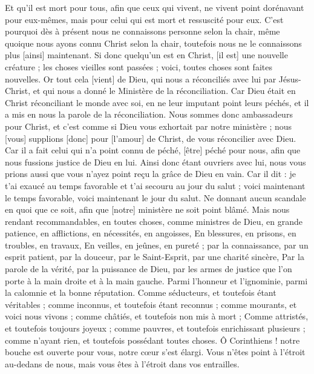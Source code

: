 \begin{multicols}{2}
Et qu'il est mort pour tous, afin que ceux qui vivent, ne vivent point dorénavant pour eux-mêmes, mais pour celui qui est mort et ressuscité pour eux.
C'est pourquoi dès à présent nous ne connaissons personne selon la chair, même quoique nous ayons connu Christ selon la chair, toutefois nous ne le connaissons plus [ainsi] maintenant.
Si donc quelqu'un est en Christ, [il est] une nouvelle créature ; les choses vieilles sont passées ; voici, toutes choses sont faites nouvelles.
Or tout cela [vient] de Dieu, qui nous a réconciliés avec lui par Jésus-Christ, et qui nous a donné le Ministère de la réconciliation.
Car Dieu était en Christ réconciliant le monde avec soi, en ne leur imputant point leurs péchés, et il a mis en nous la parole de la réconciliation.
Nous sommes donc ambassadeurs pour Christ, et c'est comme si Dieu vous exhortait par notre ministère ; nous [vous] supplions [donc] pour [l'amour] de Christ, de vous réconcilier avec Dieu.
Car il a fait celui qui n'a point connu de péché, [être] péché pour nous, afin que nous fussions justice de Dieu en lui.
\VerseOne{}Ainsi donc étant ouvriers avec lui, nous vous prions aussi que vous n'ayez point reçu la grâce de Dieu en vain.
Car il dit : je t'ai exaucé au temps favorable et t'ai secouru au jour du salut ; voici maintenant le temps favorable, voici maintenant le jour du salut.
Ne donnant aucun scandale en quoi que ce soit, afin que [notre] ministère ne soit point blâmé.
Mais nous rendant recommandables, en toutes choses, comme ministres de Dieu, en grande patience, en afflictions, en nécessités, en angoisses,
En blessures, en prisons, en troubles, en travaux,
En veilles, en jeûnes, en pureté ; par la connaissance, par un esprit patient, par la douceur, par le Saint-Esprit, par une charité sincère,
Par la parole de la vérité, par la puissance de Dieu, par les armes de justice que l'on porte à la main droite et à la main gauche.
Parmi l'honneur et l'ignominie, parmi la calomnie et la bonne réputation.
Comme séducteurs, et toutefois étant véritables ; comme inconnus, et toutefois étant reconnus ; comme mourants, et voici nous vivons ; comme châtiés, et toutefois non mis à mort ;
Comme attristés, et toutefois toujours joyeux ; comme pauvres, et toutefois enrichissant plusieurs ; comme n'ayant rien, et toutefois possédant toutes choses.
Ô Corinthiens ! notre bouche est ouverte pour vous, notre cœur s'est élargi.
Vous n'êtes point à l'étroit au-dedans de nous, mais vous êtes à l'étroit dans vos entrailles.

\end{multicols}
